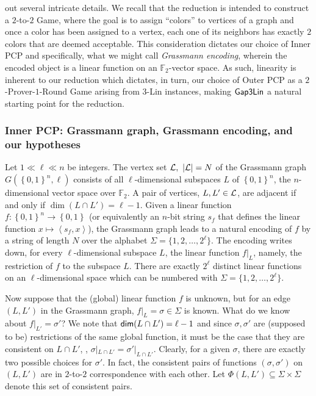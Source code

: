 \documentclass{toc}
\newcommand\set[1]{{\left\{ #1 \right\}}}
\newcommand\power[1]{\set{0,1}^{#1}}
\begin{document}
out several intricate details.
We recall that the reduction is
intended to construct a $2$-to-$2$ Game, where the goal is to assign ``colors'' to vertices
of a graph and once a color %
has been  %
assigned to
a vertex, each one of its neighbors has exactly $2$ colors
%
%
%
that are deemed acceptable.
This consideration dictates our choice of Inner PCP and
specifically,
what we might call \emph{Grassmann encoding}, %
%
wherein the encoded object is a linear function on
an %
%
${\mathbb F}_2$-vector space.
As such, linearity is inherent to
our reduction which dictates, in turn, our choice of Outer PCP as a $2$-Prover-$1$-Round
Game arising from $3$-Lin instances, making
%
%
${\sf Gap3Lin}$ a natural starting point for the reduction.

%
\subsubsection{Inner PCP: Grassmann graph, Grassmann encoding, and our hypotheses}

Let $1 \ll \ell \ll n$ be integers. The vertex set ${\cal L}, ~|{\cal L}|=N$ 
 of the Grassmann graph $G(\power{n}, \ell)$ consists of all $\ell$-dimensional subspaces $L$ of $\power{n}$, the $n$-dimensional vector space over ${\mathbb F}_2$.
 A pair of vertices, $L, L' \in {\cal L}$, %
%
are %
adjacent  %
if and only if ${\dim}(L \cap L')= \ell-1$. Given a linear function $f: \power{n}\to\power{}$ (or equivalently
an $n$-bit string $s_f$ that defines the linear function $x \mapsto \left< s_f, x \right>$), the Grassmann graph leads to a natural encoding of $f$  by a string of
length $N$ over the alphabet $\Sigma =
\{1,2,\ldots, 2^\ell\}$.  The encoding writes down, for every $\ell$-dimensional
subspace $L$, the linear function $f|_L$, namely, the restriction of $f$ to the subspace $L$. There are exactly $2^\ell$ distinct linear functions on an $\ell$-dimensional
space which can be numbered with $\Sigma = \{1,2,\ldots,2^\ell\}$.

Now suppose that the (global) linear function $f$ is unknown, but for an edge $(L, L')$ in the Grassmann graph, $f|_L = \sigma \in \Sigma$ is known. What do we know
about $f|_{L'} = \sigma'$?  We note that ${\sf dim}(L \cap L')=\ell-1$ and since $\sigma, \sigma'$ are (supposed to be)
restrictions of the same global function, it must be the case that they are consistent on $L\cap L'$, \ie,
$\sigma|_{L\cap L'} = {\sigma'}|_{L\cap L'}$. Clearly, for a given $\sigma$, there
are exactly two possible choices for $\sigma'$.
In fact, the
%
consistent pairs %
%
of functions $(\sigma, \sigma')$ on $(L, L')$
%
%
%
%
%
%
%
%
%
%
%
%
%
are in $2$-to-$2$ correspondence with each other.
Let $\Phi(L,L') \subseteq \Sigma \times \Sigma$ denote this set of consistent pairs.
\end{document}
